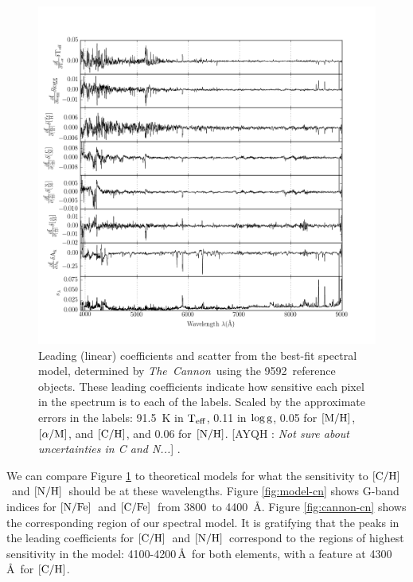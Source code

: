 \documentclass[12pt, preprint]{aastex}
\newcommand{\tc}{\textsl{The~Cannon}}
\newcommand{\teff}{\mbox{$\rm T_{eff}$}}
\newcommand{\logg}{\mbox{$\rm \log g$}}
\newcommand{\mh}{\mbox{$\rm [M/H]$}}
\newcommand{\alpham}{\mbox{$\rm [\alpha/M]$}}
\newcommand{\carbon}{\mbox{$\rm [C/H]$}}
\newcommand{\cfe}{\mbox{$\rm [C/Fe]$}}
\newcommand{\nitrogen}{\mbox{$\rm [N/H]$}}
\newcommand{\nfe}{\mbox{$\rm [N/Fe]$}}
\newcommand{\angstrom}{\mbox{\AA}}
\newcommand{\ntrobj}{9592}
\newcommand{\Comment}[2]{ [{\color{red}\sc #1 :} {{\color{cyan} \it #2}}]}
\begin{document}
\begin{figure}[!p]
\centering
\includegraphics[scale=0.7]{leading_coeffs.png}
\caption{Leading (linear) coefficients and scatter from the best-fit spectral model, 
determined by \tc\ using the \ntrobj\ reference objects. 
These leading coefficients indicate how sensitive each pixel in the spectrum is to each of the labels. 
Scaled by the approximate errors in the labels:
91.5~K in \teff, 0.11 in 
\logg, 0.05 for \mh, \alpham, and \carbon, and 0.06 for \nitrogen. \Comment{AYQH}{Not sure about uncertainties in C and N...}
\citep{Holtzman2015}.}
\label{fig:leading-coeffs}
\end{figure}

We can compare Figure \ref{fig:leading-coeffs} to 
theoretical models for what the sensitivity to
\carbon\ and \nitrogen\ should be
at these wavelengths. Figure \ref{fig:model-cn}
shows G-band indices for \nfe\ and \cfe\ from
3800\, to 4400\, \angstrom. Figure \ref{fig:cannon-cn}
shows the corresponding region of our spectral model.
It is gratifying that the peaks in the leading coefficients
for \carbon\ and \nitrogen\ correspond to the regions
of highest sensitivity in the model: 4100-4200\,\angstrom\ 
for both elements, with a feature at 4300\,\angstrom\ for 
\carbon. 
\end{document}
